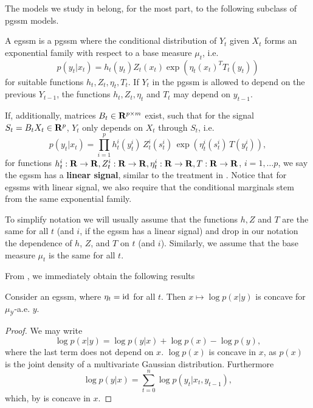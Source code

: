 The models we study in  belong, for the most part, to the following subclass of \gls{pgssm} models.
\begin{definition}
    \label{def:egssm}
    A \acrfull{egssm} is a \gls{pgssm} where the conditional distribution of $Y_{t}$ given $X_{t}$ forms an exponential family with respect to a base measure $\mu_{t}$, i.e.
    $$
    p (y_{t}|x_{t}) = h_{t}(y_{t}) Z_{t}(x_{t}) \exp \left( \eta_{t}(x_{t})^{T} T_{t}(y_{t}) \right)
    $$
    for suitable functions $h_{t}, Z_{t}, \eta_{t}, T_{t}$. If $Y_{t}$ in the \gls{pgssm} is allowed to depend on the previous $Y_{t - 1}$, the functions $h_{t}, Z_{t}, \eta_{t}$ and $T_{t}$ may depend on $y_{t - 1}$. 

    If, additionally, matrices $B_{t} \in \mathbf R^{p \times m}$ exist, such that for the signal $S_{t} = B_{t}X_{t} \in \mathbf R^{p}$, $Y_{t}$ only depends on $X_{t}$ through $S_{t}$, i.e. 
    $$
    p(y_{t}|x_{t}) = \prod_{i = 1}^p h^{i}_{t}(y^{i}_{t})\, Z^{i}_{t} (s^{i}_{t})\, \exp \left( \eta^{i}_{t} (s^{i}_{t})\,T(y^{i}_{t}) \right),
    $$
    for functions $h_{t}^{i}: \mathbf R \to \mathbf R, Z^{i}_{t}: \mathbf R \to \mathbf R, \eta^{i}_{t}: \mathbf R\to\mathbf R, T: \mathbf R\to\mathbf R$, $i = 1, \dots p$, we say the \gls{egssm} has a \textbf{linear signal}, similar to the treatment in \citep[Part II]{Durbin2012Time}. Notice that for \glspl{egssm} with linear signal, we also require that the conditional marginals stem from the same exponential family.
\end{definition}

\begin{remark}
    To simplify notation we will usually assume that the functions $h, Z$ and $T$ are the same for all $t$ (and $i$, if the \gls{egssm} has a linear signal) and drop in our notation the dependence of $h$, $Z$, and $T$ on $t$ (and $i$). Similarly, we assume that the base measure $\mu_t$ is the same for all $t$.
\end{remark}

From , we immediately obtain the following results \citep[Section 10.6.4]{Durbin2012Time}
\begin{lemma}
    Consider  an \gls{egssm}, where $\eta_{t} = \operatorname{id}$ for all $t$.  Then $x \mapsto \log p(x|y)$ is concave for $\mu_{\mathcal Y}$-a.e. $y$. 
\end{lemma}
\begin{proof}
    We may write
    $$
    \log p(x|y) = \log p(y|x) + \log p(x) - \log p(y),
    $$
    where the last term does not depend on $x$. $\log p(x)$ is concave in $x$, as $p(x)$ is the joint density of a multivariate Gaussian distribution. Furthermore 
    $$
    \log p(y | x) = \sum_{t = 0}^n \log p(y_{t} | x_{t}, y_{t - 1}),
    $$
    which, by  is concave in $x$. 
\end{proof}

